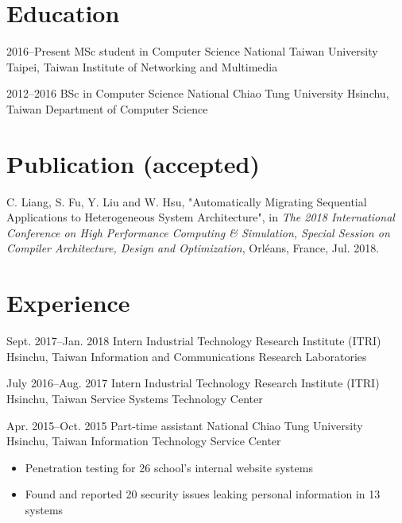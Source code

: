 \documentclass[11pt,a4paper,sans,english]{moderncv}
\begin{document}
\makecvtitle

\section{Education}
    \cventry
        {2016--Present} %
        {MSc student in Computer Science} %
        {National Taiwan University} %
        {Taipei, Taiwan} %
        {Institute of Networking and Multimedia} %
        {}

    \cventry
        {2012--2016}
        {BSc in Computer Science}
        {National Chiao Tung University}
        {Hsinchu, Taiwan}
        {Department of Computer Science}
        {%
        }
        
\section{Publication (accepted)}
    C. Liang, S. Fu, Y. Liu and W. Hsu, "Automatically Migrating Sequential Applications to Heterogeneous System Architecture", in \textit{The 2018 International Conference on High Performance Computing \& Simulation, Special Session on Compiler Architecture, Design and Optimization}, Orléans, France, Jul. 2018.

\section{Experience}
    \cventry
        {Sept. 2017--Jan. 2018} %
        {Intern} %
        {Industrial Technology Research Institute (ITRI)} %
        {Hsinchu, Taiwan} %
        {Information and Communications Research Laboratories} %
        {} %

    \cventry
        {July 2016--Aug. 2017}
        {Intern}
        {Industrial Technology Research Institute (ITRI)}
        {Hsinchu, Taiwan}
        {Service Systems Technology Center}
        {}
        
    \cventry
        {Apr. 2015--Oct. 2015}
        {Part-time assistant}
        {National Chiao Tung University}
        {Hsinchu, Taiwan}
        {Information Technology Service Center}
        {\begin{itemize}
        \item Penetration testing for 26 school's internal website systems
        \item Found and reported 20 security issues leaking personal information in 13 systems
        \end{itemize}}
        
\end{document}

